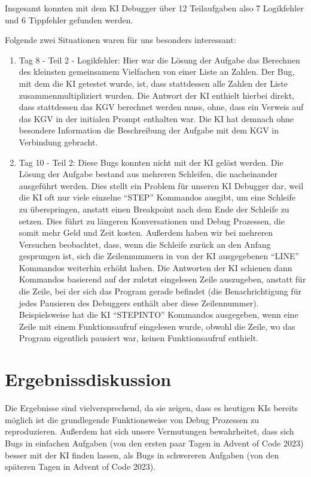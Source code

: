 \documentclass[a4paper,12pt,ngerman]{scrartcl}
\begin{document}
Insgesamt konnten mit dem KI Debugger über 12 Teilaufgaben also 7 Logikfehler und 6 Tippfehler gefunden werden.

Folgende zwei Situationen waren für uns besonders interessant:
\begin{enumerate}
\item Tag 8 - Teil 2 - Logikfehler: Hier war die Lösung der Aufgabe das Berechnen des kleinsten gemeinsamem Vielfachen von einer Liste an Zahlen. Der Bug, mit dem die KI getestet wurde, ist, dass stattdessen alle Zahlen der Liste zusammenmultipliziert wurden. Die Antwort der KI enthielt hierbei direkt, dass stattdessen das KGV berechnet werden muss, ohne, dass ein Verweis auf das KGV in der initialen Prompt enthalten war. Die KI hat demnach ohne besondere Information die Beschreibung der Aufgabe mit dem KGV in Verbindung gebracht.
\item Tag 10 - Teil 2: Diese Bugs konnten nicht mit der KI gelöst werden. Die Lösung der Aufgabe bestand aus mehreren Schleifen, die nacheinander ausgeführt werden. Dies stellt ein Problem für unseren KI Debugger dar, weil die KI oft nur viele einzelne ``STEP'' Kommandos ausgibt, um eine Schleife zu überspringen, anstatt einen Breakpoint nach dem Ende der Schleife zu setzen. Dies führt zu längeren Konversationen und Debug Prozessen, die somit mehr Geld und Zeit kosten. Außerdem haben wir bei mehreren Versuchen beobachtet, dass, wenn die Schleife zurück an den Anfang gesprungen ist, sich die Zeilennummern in von der KI ausgegebenen ``LINE'' Kommandos weiterhin erhöht haben. Die Antworten der KI schienen dann Kommandos basierend auf der zuletzt eingelesen Zeile auszugeben, anstatt für die Zeile, bei der sich das Program gerade befindet (die Benachrichtigung für jedes Pausieren des Debuggers enthält aber diese Zeilennummer). Beispielsweise hat die KI ``STEPINTO'' Kommandos ausgegeben, wenn eine Zeile mit einem Funktionsaufruf eingelesen wurde, obwohl die Zeile, wo das Program eigentlich pausiert war, keinen Funktionsaufruf enthielt.
\end{enumerate}

\section{Ergebnissdiskussion}

Die Ergebnisse sind vielversprechend, da sie zeigen, dass es heutigen KIs bereits möglich ist die grundlegende Funktionsweise von Debug Prozessen zu reproduzieren. Außerdem hat sich unsere Vermutungen bewahrheitet, dass sich Bugs in einfachen Aufgaben (von den ersten paar Tagen in Advent of Code 2023) besser mit der KI finden lassen, als Bugs in schwereren Aufgaben (von den späteren Tagen in Advent of Code 2023).
\end{document}
